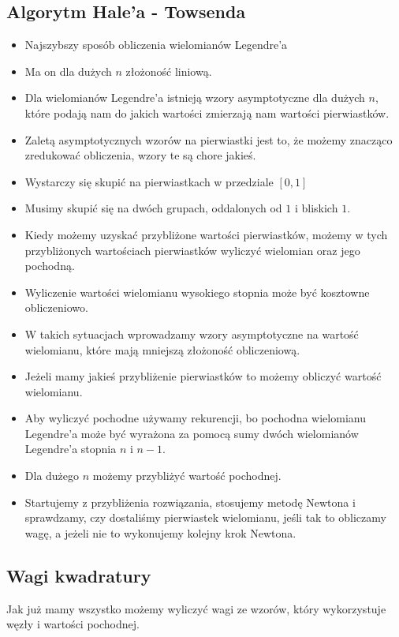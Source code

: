 \documentclass[a4paper]{article}
\begin{document}
\subsection{Algorytm Hale’a - Towsenda}
\begin{itemize}
    \item Najszybszy sposób obliczenia wielomianów Legendre'a
    \item Ma on dla dużych $n$ złożoność liniową.
    \item Dla wielomianów Legendre'a istnieją wzory asymptotyczne dla dużych $n$, które podają nam do jakich wartości zmierzają nam wartości pierwiastków.
    \item Zaletą asymptotycznych wzorów na pierwiastki jest to, że możemy znacząco zredukować obliczenia, wzory te są chore jakieś.
    \item Wystarczy się skupić na pierwiastkach w przedziale $[0, 1]$
    \item Musimy skupić się na dwóch grupach, oddalonych od $1$ i bliskich $1$.
    \item Kiedy możemy uzyskać przybliżone wartości pierwiastków, możemy w tych przybliżonych wartościach pierwiastków wyliczyć wielomian oraz jego pochodną.
    \item Wyliczenie wartości wielomianu wysokiego stopnia może być kosztowne obliczeniowo.
    \item W takich sytuacjach wprowadzamy wzory asymptotyczne na wartość wielomianu, które mają mniejszą złożoność obliczeniową.
    \item Jeżeli mamy jakieś przybliżenie pierwiastków to możemy obliczyć wartość wielomianu.
    \item Aby wyliczyć pochodne używamy rekurencji, bo pochodna wielomianu Legendre'a może być wyrażona za pomocą sumy dwóch wielomianów Legendre'a stopnia $n$ i $n-1$.
    \item Dla dużego $n$ możemy przybliżyć wartość pochodnej.
    \item Startujemy z przybliżenia rozwiązania, stosujemy metodę Newtona i sprawdzamy, czy dostaliśmy pierwiastek wielomianu, jeśli tak to obliczamy wagę, a jeżeli nie to wykonujemy kolejny krok Newtona.
\end{itemize}

\subsection{Wagi kwadratury}
Jak już mamy wszystko możemy wyliczyć wagi ze wzorów, który wykorzystuje węzły i wartości pochodnej.
\end{document}
